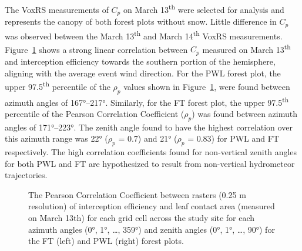 \documentclass[
  letterpaper,
  DIV=11,
  numbers=noendperiod]{scrartcl}
\begin{document}
The VoxRS measurements of \(C_p\) on March 13\textsuperscript{th} were
selected for analysis and represents the canopy of both forest plots
without snow. Little difference in \(C_p\) was observed between the
March 13\textsuperscript{th} and March 14\textsuperscript{th} VoxRS
measurements. Figure~\ref{fig-hemi-ip-cc} shows a strong linear
correlation between \(C_p\) measured on March 13\textsuperscript{th} and
interception efficiency towards the southern portion of the hemisphere,
aligning with the average event wind direction. For the PWL forest plot,
the upper 97.5\textsuperscript{th} percentile of the \(\rho_p\) values
shown in Figure~\ref{fig-hemi-ip-cc}, were found between azimuth angles
of 167°--217°. Similarly, for the FT forest plot, the upper
97.5\textsuperscript{th} percentile of the Pearson Correlation
Coefficient (\(\rho_p\)) was found between azimuth angles of 171°--223°.
The zenith angle found to have the highest correlation over this azimuth
range was 22° (\(\rho_p\) = 0.7) and 21° (\(\rho_p\) = 0.83) for PWL and
FT respectively. The high correlation coefficients found for
non-vertical zenith angles for both PWL and FT are hypothesized to
result from non-vertical hydrometeor trajectories.

\begin{figure}[H]


\caption{\label{fig-hemi-ip-cc}The Pearson Correlation Coefficient
between rasters (0.25 m resolution) of interception efficiency and leaf
contact area (measured on March 13th) for each grid cell across the
study site for each azimuth angles (0°, 1°, \ldots, 359°) and zenith
angles (0°, 1°, \ldots, 90°) for the FT (left) and PWL (right) forest
plots.}

\end{figure}%
\end{document}
